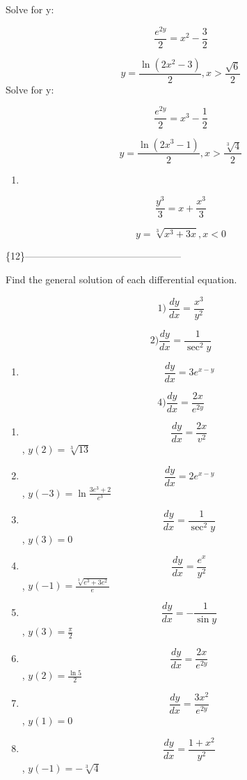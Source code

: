 \documentclass[
]{article}
\providecommand{\tightlist}{%
  \setlength{\itemsep}{0pt}\setlength{\parskip}{0pt}}
\begin{document}
Solve for y:

\[\frac{e^{2y}}{2} = x^2 - \frac{3}{2}\]

\[y = \frac{\ln(2x^2 - 3)}{2}, x > \frac{\sqrt{6}}{2}\] Solve for y:

\[\frac{e^{2y}}{2} = x^3 - \frac{1}{2}\]

\[y = \frac{\ln(2x^3 - 1)}{2}, x > \frac{\sqrt[3]{4}}{2}\]

\begin{enumerate}
\def\labelenumi{\arabic{enumi})}
\setcounter{enumi}{11}
\tightlist
\item
\end{enumerate}

\[\frac{y^3}{3} = x + \frac{x^3}{3}\]

\[y = \sqrt[3]{x^3 + 3x}, x < 0\]

\{12\}------------------------------------------------

Find the general solution of each differential equation.

\[1) \ \frac{dy}{dx} = \frac{x^3}{y^2}\]

\[2) \frac{dy}{dx} = \frac{1}{\sec^2 y}\]

\begin{enumerate}
\def\labelenumi{\arabic{enumi})}
\setcounter{enumi}{2}
\tightlist
\item
  \[\frac{dy}{dx} = 3e^{x-y}\]
\end{enumerate}

\[4) \frac{dy}{dx} = \frac{2x}{e^{2y}}\]

\begin{enumerate}
\def\labelenumi{\arabic{enumi})}
\setcounter{enumi}{4}
\item
  \[\frac{dy}{dx} = \frac{2x}{v^2}\] , \(y(2) = \sqrt[3]{13}\)
\item
  \[\frac{dy}{dx} = 2e^{x-y}\] , \(y(-3) = \ln \frac{3e^3 + 2}{e^3}\)
\item
  \[\frac{dy}{dx} = \frac{1}{\sec^2 y}\] , \(y(3) = 0\)
\item
  \[\frac{dy}{dx} = \frac{e^x}{y^2}\] ,
  \(y(-1) = \frac{\sqrt[3]{e^3 + 3e^2}}{e}\)
\item
  \[\frac{dy}{dx} = -\frac{1}{\sin y}\] , \(y(3) = \frac{\pi}{2}\)
\item
  \[\frac{dy}{dx} = \frac{2x}{e^{2y}}\] , \(y(2) = \frac{\ln 5}{2}\)
\item
  \[\frac{dy}{dx} = \frac{3x^2}{e^{2y}}\] , \(y(1) = 0\)
\item
  \[\frac{dy}{dx} = \frac{1+x^2}{y^2}\] , \(y(-1) = -\sqrt[3]{4}\)
\end{enumerate}
\end{document}
